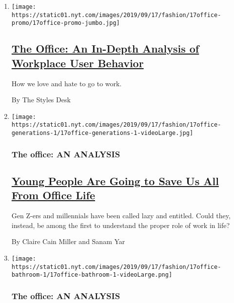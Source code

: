 \begin{enumerate}
\def\labelenumi{\arabic{enumi}.}
\item
  \texttt{[image: https://static01.nyt.com/images/2019/09/17/fashion/17office-promo/17office-promo-jumbo.jpg]}

  \hypertarget{the-office-an-in-depth-analysis-of-workplace-user-behavior}{%
  \subsection{\texorpdfstring{\href{/interactive/2019/09/17/style/the-office.html}{The
  Office: An In-Depth Analysis of Workplace User
  Behavior}}{The Office: An In-Depth Analysis of Workplace User Behavior}}\label{the-office-an-in-depth-analysis-of-workplace-user-behavior}}

  How we love and hate to go to work.

  By The Styles Desk
\item
  \texttt{[image: https://static01.nyt.com/images/2019/09/17/fashion/17office-generations-1/17office-generations-1-videoLarge.jpg]}

  \hypertarget{the-office-an-analysis-1}{%
  \subsubsection{The office: AN
  ANALYSIS}\label{the-office-an-analysis-1}}

  \hypertarget{young-people-are-going-to-save-us-all-from-office-life}{%
  \subsection{\texorpdfstring{\href{/2019/09/17/style/generation-z-millennials-work-life-balance.html}{Young
  People Are Going to Save Us All From Office
  Life}}{Young People Are Going to Save Us All From Office Life}}\label{young-people-are-going-to-save-us-all-from-office-life}}

  Gen Z-ers and millennials have been called lazy and entitled. Could
  they, instead, be among the first to understand the proper role of
  work in life?

  By Claire Cain Miller and Sanam Yar
\item
  \texttt{[image: https://static01.nyt.com/images/2019/09/17/fashion/17office-bathroom-1/17office-bathroom-1-videoLarge.png]}

  \hypertarget{the-office-an-analysis-2}{%
  \subsubsection{The office: AN
  ANALYSIS}\label{the-office-an-analysis-2}}


\end{enumerate}
